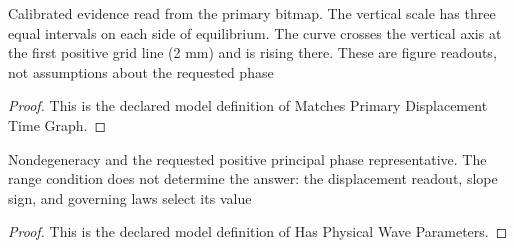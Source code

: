 \begin{definition}
  \label{def:physics:phyx-mini-0300:phyxminiproblems-problemphyxmini0300-matchesprimarydisplacementtimegraph}
  Calibrated evidence read from the primary bitmap. The vertical scale has three equal intervals on each side of equilibrium. The curve crosses the vertical axis at the first positive grid line (2 mm) and is rising there. These are figure readouts, not assumptions about the requested phase
\end{definition}
\begin{proof}
  This is the declared model definition of Matches Primary Displacement Time Graph.
\end{proof}
\begin{definition}
  \label{def:physics:phyx-mini-0300:phyxminiproblems-problemphyxmini0300-hasphysicalwaveparameters}
  Nondegeneracy and the requested positive principal phase representative. The range condition does not determine the answer: the displacement readout, slope sign, and governing laws select its value
\end{definition}
\begin{proof}
  This is the declared model definition of Has Physical Wave Parameters.
\end{proof}
